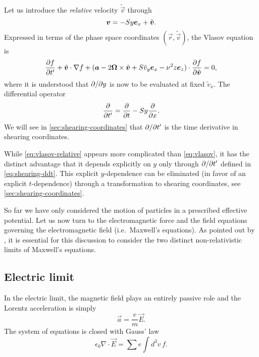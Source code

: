 \documentclass[aps,pre,notitlepage,amsmath,amssymb,amsfonts,nobibnotes,nofootinbib,superscriptaddress,onecolumn,a4paper,10pt]{revtex4-1}
\newcommand{\tvec}[1]{\tilde{\vec{#1}}}
\begin{document}
Let us introduce the \emph{relative} velocity $\tvec{v}$ through
\begin{equation}
  \label{eq:relative-velocity}
  \vec{v} = -Sy\ex + \tvec{v}.
\end{equation}
Expressed in terms of the phase space coordinates $(\vec{r},\tvec{v})$,
the Vlasov equation  is
\begin{equation}
  \label{eq:vlasov-relative}
  \pder{f}{t'} + \tilde{\vec{v}}\cdot\nabla f
  + (\vec{a} - 2\vec{\Omega}\times\tvec{v} + S\tilde{v}_y\ex - \nu^2 z\ez)
  \cdot\pder{f}{\tvec{v}} = 0,
\end{equation}
where it is understood that $\partial{}/\partial{y}$ is now to be evaluated at fixed
$\tilde{v}_x$. The differential operator
\begin{equation}
  \label{eq:shearing-ddt}
  \frac{\partial}{\partial t'} = \frac{\partial}{\partial t} - Sy\frac{\partial}{\partial x}.
\end{equation}
We will see in \cref{sec:shearing-coordinates} that $\partial{}/\partial{t'}$ is the time
derivative in shearing coordinates.

While \cref{eq:vlasov-relative} appears more complicated than
\cref{eq:vlasov}, it has the distinct advantage that it depends explicitly on
$y$ only through $\partial{}/\partial{t'}$ defined in \cref{eq:shearing-ddt}. This
explicit $y$-dependence can be eliminated (in favor of an explicit
$t$-dependence) through a transformation to shearing coordinates, see
\cref{sec:shearing-coordinates}.

So far we have only considered the motion of particles in a prescribed
effective potential. Let us now turn to the electromagnetic force and the
field equations governing the electromagnetic field (i.e.\ Maxwell's
equations). As pointed out by \citet{LeBellac1973}, it is essential for this
discussion to consider the two distinct non-relativistic limits of Maxwell's
equations.

\subsection{Electric limit}\label{sec:electric}

In the electric limit, the magnetic field plays an entirely passive role and
the Lorentz acceleration is simply
\begin{equation}
  \label{eq:electric-accel}
  \vec{a} = \frac{e}{m}\vec{E}.
\end{equation}
The system of equations is closed with Gauss' law
\begin{equation}
  \epsilon_0\nabla\cdot\vec{E} = \sum e\int\!d^3v\,f.
\end{equation}
\end{document}
